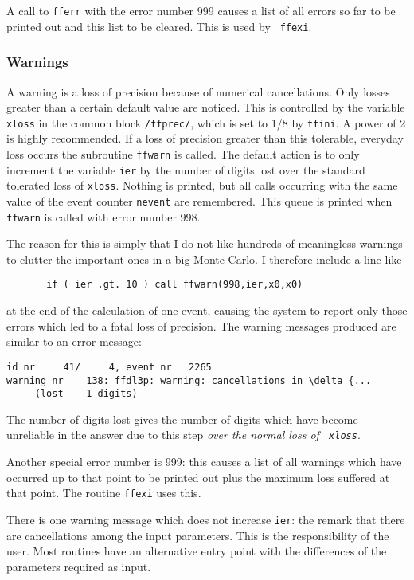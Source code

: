 A call to {\tt fferr} with the error number 999 causes a list of all errors so 
far to be printed out and this list to be cleared.  This is used by {\tt 
ffexi}.

\subsubsection{Warnings}

A warning is a loss of precision because of numerical cancellations.  Only 
losses greater than a certain default value are noticed.  This is controlled 
by the variable {\tt xloss} in the common block {\tt /ffprec/}, which is set 
to 1/8 by {\tt ffini}.  A power of 2 is highly recommended.  If a loss of 
precision greater than this tolerable, everyday loss occurs the subroutine 
{\tt ffwarn} is called.  The default action is to only increment the variable 
{\tt ier} by the number of digits lost over the standard tolerated loss of 
{\tt xloss}.   Nothing is printed, but all calls occurring with the same value 
of the event counter {\tt nevent} are remembered.  This queue is printed when 
{\tt ffwarn} is called with error number 998.

The reason for this is simply that I do not like hundreds of meaningless 
warnings to clutter the important ones in a big Monte Carlo.  I therefore 
include a line like
\begin{verbatim}
       if ( ier .gt. 10 ) call ffwarn(998,ier,x0,x0)
\end{verbatim}
at the end of the calculation of one event, causing the system to report only 
those errors which led to a fatal loss of precision.  The warning messages 
produced are similar to an error message:
\begin{verbatim}
id nr     41/     4, event nr   2265
warning nr    138: ffdl3p: warning: cancellations in \delta_{...
     (lost    1 digits)
\end{verbatim}											%
The number of digits lost gives the number of digits which have become 
unreliable in the answer due to this step {\em over the normal loss of {\tt 
xloss}}.

Another special error number is 999: this causes a list of all warnings which 
have occurred up to that point to be printed out plus the maximum loss 
suffered at that point.  The routine {\tt ffexi} uses this.

There is one warning message which does not increase {\tt ier}: the remark 
that there are cancellations among the input parameters.  This is the  
responsibility of the user.  Most routines have an alternative entry point 
with the differences of the parameters required as input.

